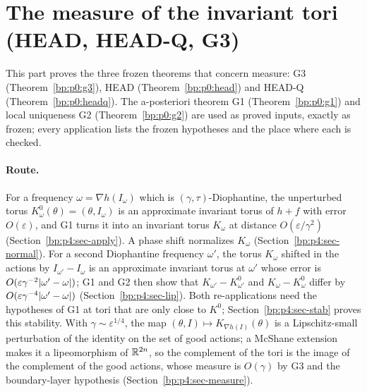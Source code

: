 \section{The measure of the invariant tori (HEAD, HEAD-Q, G3)}\label{bp:p4}

\newcommand{\pfh}{\mathbf{h}}
\newcommand{\pfD}{\mathfrak{B}}
\newcommand{\pfL}{L_{+}}
\newcommand{\pfg}{g}
\newcommand{\infd}{\operatorname{infDist}}

This part proves the three frozen theorems that concern measure: G3
(Theorem~\ref{bp:p0:g3}), HEAD (Theorem~\ref{bp:p0:head}) and HEAD-Q
(Theorem~\ref{bp:p0:headq}). The a-posteriori theorem G1 (Theorem~\ref{bp:p0:g1}) and local
uniqueness G2 (Theorem~\ref{bp:p0:g2}) are used as proved inputs, exactly as frozen; every
application lists the frozen hypotheses and the place where each is checked.

\paragraph{Route.} For a frequency $\omega=\nabla h(I_\omega)$ which is $(\gamma,\tau)$-Diophantine,
the unperturbed torus $K^0_\omega(\theta)=(\theta,I_\omega)$ is an approximate invariant torus of
$h+f$ with error $O(\varepsilon)$, and G1 turns it into an invariant torus $K_\omega$ at distance
$O(\varepsilon/\gamma^2)$ (Section~\ref{bp:p4:sec-apply}). A phase shift normalizes $K_\omega$
(Section~\ref{bp:p4:sec-normal}). For a second Diophantine frequency $\omega'$, the torus
$K_\omega$ shifted in the actions by $I_{\omega'}-I_\omega$ is an approximate invariant torus at
$\omega'$ whose error is $O(\varepsilon\gamma^{-2}\lvert \omega'-\omega\rvert)$; G1 and G2 then show that
$K_{\omega'}-K^0_{\omega'}$ and $K_\omega-K^0_\omega$ differ by $O(\varepsilon\gamma^{-4}\lvert \omega'-\omega\rvert)$
(Section~\ref{bp:p4:sec-lip}). Both re-applications need the hypotheses of G1 at tori that are
only close to $K^0$; Section~\ref{bp:p4:sec-stab} proves this stability. With
$\gamma\sim\varepsilon^{1/4}$, the map $(\theta,I)\mapsto K_{\nabla h(I)}(\theta)$ is a
Lipschitz-small perturbation of the identity on the set of good actions; a McShane extension makes
it a lipeomorphism of $\mathbb{R}^{2n}$, so the complement of the tori is the image of the complement of
the good actions, whose measure is $O(\gamma)$ by G3 and the boundary-layer hypothesis
(Section~\ref{bp:p4:sec-measure}).

